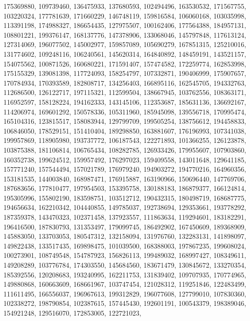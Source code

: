 {{    175369880, 109739460, 136475933, 137680593, 102494496, 163530532,
    171567755, 103220324, 177781639, 171660229, 146748119, 159816584,
    106060168, 103035998, 113391198, 174988327, 186654435, 127975507,
    100162406, 177564388, 184957131, 108801221, 199376147, 168137776,
    147378906, 133068046, 145797848, 117613124, 127314069, 196077502,
    145002977, 159857089, 105690279, 167851315, 125210016, 131774602,
    109248116, 106240561, 145620314, 164840892, 148459191, 143521157,
    154075562, 100871526, 160680221, 171591407, 157474582, 172259774,
    162853998, 175155329, 139081398, 117724093, 158254797, 107332871,
    190406999, 175907657, 170784934, 170393589, 182808717, 134256403,
    166895116, 162545705, 194332763, 112686500, 126122717, 197115321,
    112599504, 138667945, 103762556, 108363171, 116952597, 158128224,
    194162333, 143145106, 112353687, 185631136, 136692167, 114206974,
    169601292, 150578336, 105311960, 185945098, 139556718, 170995474,
    165104316, 123815517, 158083944, 129799709, 199505254, 138756612,
    194458833, 106846050, 178529151, 151410404, 189298850, 163881607,
    176196993, 107341038, 199957869, 118905980, 193737772, 106187543,
    122271893, 101366255, 126123878, 103875388, 181106814, 106765434,
    108282785, 126933426, 179955607, 107903860, 160352738, 199624512,
    159957492, 176297023, 159409558, 143011648, 129641185, 157771240,
    157544494, 157021789, 176979240, 194903272, 194770216, 164960356,
    153181535, 144003840, 168987471, 176915887, 163190966, 150696440,
    147769706, 187683656, 177810477, 197954503, 153395758, 130188183,
    186879377, 166124814, 195305996, 155802190, 183598751, 103512712,
    190432315, 180498719, 168687775, 194656634, 162210342, 104440855,
    149785037, 192738694, 129353661, 193778292, 187359378, 143470323,
    102371458, 137923557, 111863634, 119294601, 183182291, 196416500,
    187830793, 131353497, 179099745, 186492902, 167450609, 189368909,
    145883050, 133703053, 180547312, 132158094, 131976760, 132283131,
    141898097, 149822438, 133517435, 169898475, 101039500, 168388003,
    197867235, 199608024, 100273901, 108749548, 154787923, 156826113,
    199489032, 168997427, 108349611, 149208289, 103776784, 174303550,
    145684560, 183671479, 130845672, 133270354, 185392556, 120208683,
    193240995, 162211753, 131839402, 109707935, 170774965, 149880868,
    160663609, 168661967, 103747454, 121028312, 119251846, 122483499,
    111611495, 166556037, 196967613, 199312829, 196077608, 127799010,
    107830360, 102338272, 198790854, 102387615, 157445430, 192601191,
    100543379, 198389046, 154921248, 129516070, 172853005, 122721023,
}}
